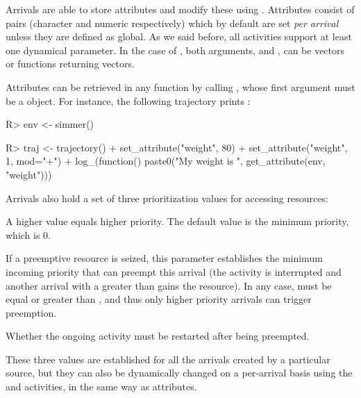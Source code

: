 \documentclass[
  nojss]{jss}
\providecommand{\tightlist}{%
  \setlength{\itemsep}{0pt}\setlength{\parskip}{0pt}}
\begin{document}
Arrivals are able to store attributes and modify these using
. Attributes consist of pairs 
(character and numeric respectively) which by default are set \emph{per
arrival} unless they are defined as global. As we said before, all
activities support at least one dynamical parameter. In the case of
, both arguments,  and ,
can be vectors or functions returning vectors.

Attributes can be retrieved in any  function by calling
, whose first argument must be a 
object. For instance, the following trajectory prints :

\begin{CodeChunk}
\begin{CodeInput}
R> env <- simmer()
\end{CodeInput}
\end{CodeChunk}

\begin{CodeChunk}
\begin{CodeInput}
R> traj <- trajectory() %
+   set_attribute("weight", 80) %
+   set_attribute("weight", 1, mod="+") %
+   log_(function() paste0("My weight is ", get_attribute(env, "weight")))
\end{CodeInput}
\end{CodeChunk}

Arrivals also hold a set of three prioritization values for accessing
resources:

\begin{description}
\tightlist
\item[priority]
A higher value equals higher priority. The default value is the minimum
priority, which is 0.
\item[preemptible]
If a preemptive resource is seized, this parameter establishes the
minimum incoming priority that can preempt this arrival (the activity is
interrupted and another arrival with a  greater than
 gains the resource). In any case, 
must be equal or greater than , and thus only higher
priority arrivals can trigger preemption.
\item[restart]
Whether the ongoing activity must be restarted after being preempted.
\end{description}

These three values are established for all the arrivals created by a
particular source, but they can also be dynamically changed on a
per-arrival basis using the  and
 activities, in the same way as attributes.
\end{document}
